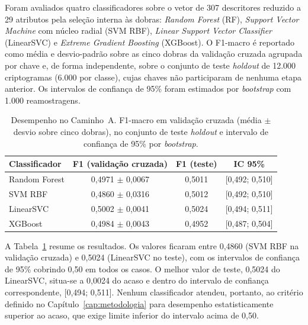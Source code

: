 Foram avaliados quatro classificadores sobre o vetor de 307 descritores reduzido a 29 atributos pela seleção interna às dobras: \textit{Random Forest} (RF), \textit{Support Vector Machine} com núcleo radial (SVM RBF), \textit{Linear Support Vector Classifier} (LinearSVC) e \textit{Extreme Gradient Boosting} (XGBoost). O F1-macro é reportado como média e desvio-padrão sobre as cinco dobras da validação cruzada agrupada por chave e, de forma independente, sobre o conjunto de teste \textit{holdout} de 12.000 criptogramas (6.000 por classe), cujas chaves não participaram de nenhuma etapa anterior. Os intervalos de confiança de 95\% foram estimados por \textit{bootstrap} com 1.000 reamostragens.

\begin{table}[htb]
\centering
\caption{Desempenho no Caminho~A. F1-macro em validação cruzada (média $\pm$ desvio sobre cinco dobras), no conjunto de teste \textit{holdout} e intervalo de confiança de 95\% por \textit{bootstrap}.}
\label{tab:res-a-f1}
\begin{tabular}{lccc}
\toprule
Classificador & F1 (validação cruzada) & F1 (teste) & IC 95\% \\
\midrule
Random Forest & 0,4971 $\pm$ 0,0067 & 0,5011 & [0,492; 0,510] \\
SVM RBF       & 0,4860 $\pm$ 0,0316 & 0,5012 & [0,492; 0,510] \\
LinearSVC     & 0,5002 $\pm$ 0,0041 & 0,5024 & [0,494; 0,511] \\
XGBoost       & 0,4984 $\pm$ 0,0043 & 0,4952 & [0,487; 0,504] \\
\bottomrule
\end{tabular}
\end{table}

A Tabela~\ref{tab:res-a-f1} resume os resultados. Os valores ficaram entre 0,4860 (SVM RBF na validação cruzada) e 0,5024 (LinearSVC no teste), com os intervalos de confiança de 95\% cobrindo 0,50 em todos os casos. O melhor valor de teste, 0,5024 do LinearSVC, situa-se a 0,0024 do acaso e dentro do intervalo de confiança correspondente, [0,494; 0,511]. Nenhum classificador atendeu, portanto, ao critério definido no Capítulo~\ref{cap:metodologia} para desempenho estatisticamente superior ao acaso, que exige limite inferior do intervalo acima de 0,50.

